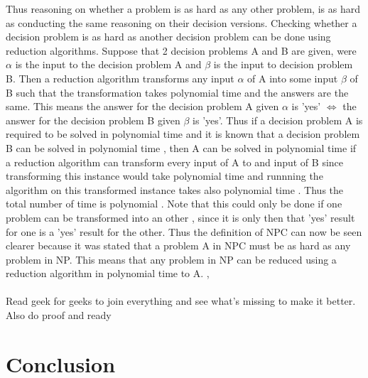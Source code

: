 \documentclass{article}
\begin{document}
Thus reasoning on whether a problem is as hard as any other problem, is as hard as conducting the same reasoning on their decision versions. Checking whether a decision problem is as hard as another decision problem can be done using reduction algorithms. Suppose that 2 decision problems A and B are given, were $\alpha$ is the input to the decision problem A and $\beta$ is the input to decision problem B. Then a reduction algorithm transforms any input $\alpha$ of A into some input $\beta$ of B such that the transformation takes polynomial time and the answers are the same. This means the answer for the decision problem A given $\alpha$ is 'yes' $\iff$ the answer for the decision problem B given $\beta$ is 'yes'. Thus if a decision problem A is required to be solved in polynomial time and it is known that a decision problem B can be solved in polynomial time , then A can be solved in polynomial time if a reduction algorithm can transform every input of A to and input of B since transforming this instance would take polynomial time and runnning the algorithm on this transformed instance takes also polynomial time . Thus the total number of time is polynomial . Note that this could only be done if one problem can be transformed into an other , since it is only then that 'yes' result for one is a 'yes' result for the other. Thus the definition of NPC can now be seen clearer because it was stated that a problem A in NPC must be as hard as any problem in NP. This means that any problem in NP can be reduced using a reduction algorithm in polynomial time to A. \cite{cormen_leiserson_rivest_stein}, \cite{geeks_for_geeks_2018_2}\\
\\
Read geek for geeks to join everything and see what's missing to make it better. Also do proof and ready

\newpage
\section{Conclusion}
\newpage


\end{document}
